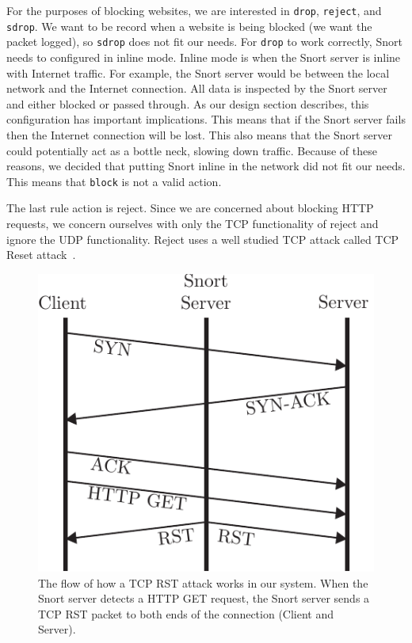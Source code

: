 For the purposes of blocking websites, we are interested in \texttt{drop},
\texttt{reject}, and \texttt{sdrop}. We want to be record when a website is
being blocked (we want the packet logged), so \texttt{sdrop} does not fit our
needs. For \texttt{drop} to work correctly, Snort needs to configured in inline
mode. Inline mode is when the Snort server is inline with Internet traffic. For
example, the Snort server would be between the local network and the Internet
connection. All data is inspected by the Snort server and either blocked or
passed through. As our design section describes, this configuration has
important implications. This means that if the Snort server fails then the
Internet connection will be lost. This also means that the Snort server could
potentially act as a bottle neck, slowing down traffic. Because of these
reasons, we decided that putting Snort inline in the network did not fit our
needs. This means that \texttt{block} is not a valid action.

The last rule action is reject. Since we are concerned about blocking HTTP
requests, we concern ourselves with only the TCP functionality of reject and
ignore the UDP functionality. Reject uses a well studied TCP attack called TCP
Reset attack~\cite{watson2004slipping}.

\begin{figure}[!t]
    \centering
    \includegraphics[width=.8\columnwidth]{figures/tcp_reset}
    \caption{The flow of how a TCP RST attack works in our system. When the
    Snort server detects a HTTP GET request, the Snort server sends a TCP RST
    packet to both ends of the connection (Client and Server).}
    \label{fig:tcp_reset}
\end{figure}

